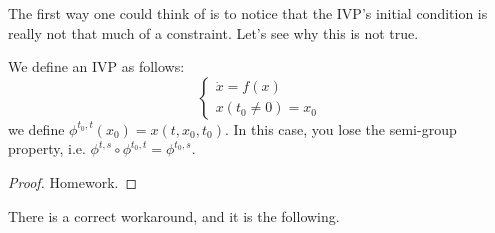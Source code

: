 The first way one could think of is to notice that the IVP's initial condition is really not that much of a constraint. Let's see why this is not true.
\begin{proposition}
    We define an IVP as follows:
    \begin{equation*}
        \begin{cases}
            \dot{x}=f(x) \\
            x(t_0\neq0)=x_0
        \end{cases}
    \end{equation*}
    we define $\phi^{t_0, t}(x_0)=x(t, x_0, t_0)$. In this case, you lose the semi-group property, i.e. $\phi^{t, s}\circ \phi^{t_0, t}=\phi^{t_0,s}$.
\end{proposition}
\begin{proof}
    Homework.
\end{proof}

There is a correct workaround, and it is the following.

